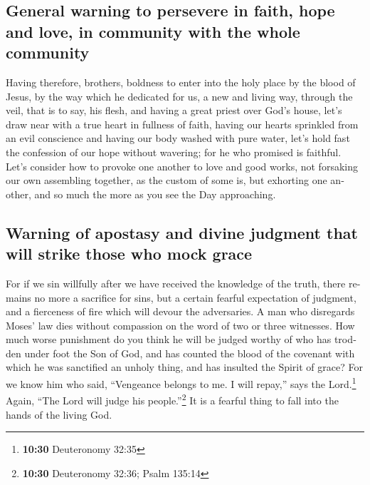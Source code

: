 \begin{paracol}{2}
\begin{otherlanguage}{english}
\hypertarget{general-warning-to-persevere-in-faith-hope-and-love-in-community-with-the-whole-community}{%
\subsection{General warning to persevere in faith, hope and love, in
community with the whole
community}\label{general-warning-to-persevere-in-faith-hope-and-love-in-community-with-the-whole-community}}

 Having therefore, brothers, boldness to enter into the
holy place by the blood of Jesus,  by the way which he
dedicated for us, a new and living way, through the veil, that is to
say, his flesh,  and having a great priest over God's
house,  let's draw near with a true heart in fullness of
faith, having our hearts sprinkled from an evil conscience and having
our body washed with pure water,  let's hold fast the
confession of our hope without wavering; for he who promised is
faithful.  Let's consider how to provoke one another to
love and good works,  not forsaking our own assembling
together, as the custom of some is, but exhorting one another, and so
much the more as you see the Day approaching.

\hypertarget{warning-of-apostasy-and-divine-judgment-that-will-strike-those-who-mock-grace}{%
\subsection{Warning of apostasy and divine judgment that will strike
those who mock
grace}\label{warning-of-apostasy-and-divine-judgment-that-will-strike-those-who-mock-grace}}

 For if we sin willfully after we have received the
knowledge of the truth, there remains no more a sacrifice for sins,
 but a certain fearful expectation of judgment, and a
fierceness of fire which will devour the adversaries.  A
man who disregards Moses' law dies without compassion on the word of two
or three witnesses.  How much worse punishment do you
think he will be judged worthy of who has trodden under foot the Son of
God, and has counted the blood of the covenant with which he was
sanctified an unholy thing, and has insulted the Spirit of grace?
 For we know him who said, ``Vengeance belongs to me. I
will repay,'' says the Lord.\footnote{\textbf{10:30} Deuteronomy 32:35}
Again, ``The Lord will judge his people.''\footnote{\textbf{10:30}
  Deuteronomy 32:36; Psalm 135:14}  It is a fearful thing
to fall into the hands of the living God.


\end{otherlanguage}
\end{paracol}
